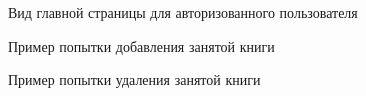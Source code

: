\begin{figure}[H]
\caption{Вид главной страницы для авторизованного пользователя}
\label{fig:image}
\end{figure}

\begin{figure}[H]
\caption{Пример попытки добавления занятой книги}
\label{fig:image}
\end{figure}

\begin{figure}[H]
\caption{Пример попытки удаления занятой книги}
\label{fig:image}
\end{figure}





















